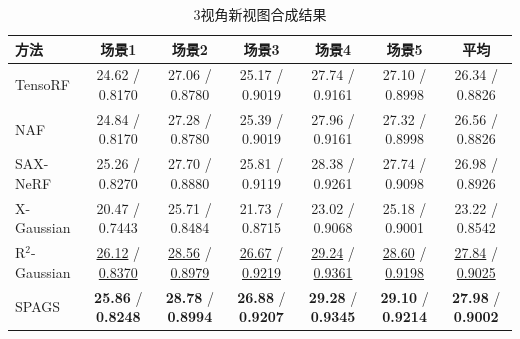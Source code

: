 
\begin{table}[htbp]
    \centering
    \caption{3视角新视图合成结果}
    \label{tab:spags_3view}
    \footnotesize
    \begin{tabular*}{\textwidth}{@{\extracolsep{\fill}}lcccccc@{}}
        \toprule
        方法 & 场景1 & 场景2 & 场景3 & 场景4 & 场景5 & 平均 \\
        \midrule
        TensoRF & 24.62 / 0.8170 & 27.06 / 0.8780 & 25.17 / 0.9019 & 27.74 / 0.9161 & 27.10 / 0.8998 & 26.34 / 0.8826 \\
        NAF & 24.84 / 0.8170 & 27.28 / 0.8780 & 25.39 / 0.9019 & 27.96 / 0.9161 & 27.32 / 0.8998 & 26.56 / 0.8826 \\
        SAX-NeRF & 25.26 / 0.8270 & 27.70 / 0.8880 & 25.81 / 0.9119 & 28.38 / 0.9261 & 27.74 / 0.9098 & 26.98 / 0.8926 \\
        X-Gaussian & 20.47 / 0.7443 & 25.71 / 0.8484 & 21.73 / 0.8715 & 23.02 / 0.9068 & 25.18 / 0.9001 & 23.22 / 0.8542 \\
        R$^2$-Gaussian & \underline{26.12} / \underline{0.8370} & \underline{28.56} / \underline{0.8979} & \underline{26.67} / \underline{0.9219} & \underline{29.24} / \underline{0.9361} & \underline{28.60} / \underline{0.9198} & \underline{27.84} / \underline{0.9025} \\
        SPAGS & \textbf{25.86} / \textbf{0.8248} & \textbf{28.78} / \textbf{0.8994} & \textbf{26.88} / \textbf{0.9207} & \textbf{29.28} / \textbf{0.9345} & \textbf{29.10} / \textbf{0.9214} & \textbf{27.98} / \textbf{0.9002} \\
        \bottomrule
    \end{tabular*}
\end{table}

